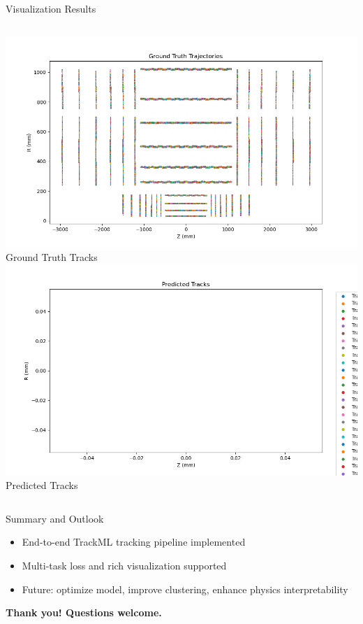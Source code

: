 \documentclass{beamer}
\begin{document}
\begin{frame}{Visualization Results}
  \begin{columns}
      \includegraphics[width=\textwidth]{../../results/ground_truth.png}
      \centering Ground Truth Tracks
      \includegraphics[width=\textwidth]{../../results/predictions.png}
      \centering Predicted Tracks
  \end{columns}
\end{frame}

\begin{frame}{Summary and Outlook}
  \begin{itemize}
    \item End-to-end TrackML tracking pipeline implemented
    \item Multi-task loss and rich visualization supported
    \item Future: optimize model, improve clustering, enhance physics interpretability
  \end{itemize}
  \vspace{1em}
  \centering
  \textbf{Thank you! Questions welcome.}
\end{frame}
\end{document}
